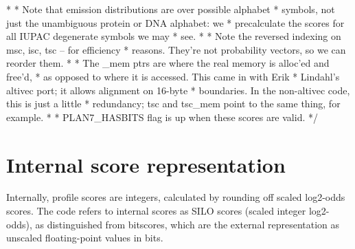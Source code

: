 \begin{cchunk}
\end{cchunk}

\begin{cchunk}
   *
   * Note that emission distributions are over possible alphabet
   * symbols, not just the unambiguous protein or DNA alphabet: we
   * precalculate the scores for all IUPAC degenerate symbols we may
   * see.
   *
   * Note the reversed indexing on msc, isc, tsc -- for efficiency
   * reasons. They're not probability vectors, so we can reorder them.
   * 
   * The _mem ptrs are where the real memory is alloc'ed and free'd,
   * as opposed to where it is accessed.  This came in with Erik
   * Lindahl's altivec port; it allows alignment on 16-byte
   * boundaries. In the non-altivec code, this is just a little
   * redundancy; tsc and tsc_mem point to the same thing, for example.
   * 
   * PLAN7_HASBITS flag is up when these scores are valid.
   */
\end{cchunk}

%
\section{Internal score representation}
%

Internally, profile scores are integers, calculated by rounding off
scaled log2-odds scores. The code refers to internal scores as SILO
scores (scaled integer log2-odds), as distinguished from bitscores,
which are the external representation as unscaled floating-point
values in bits.


